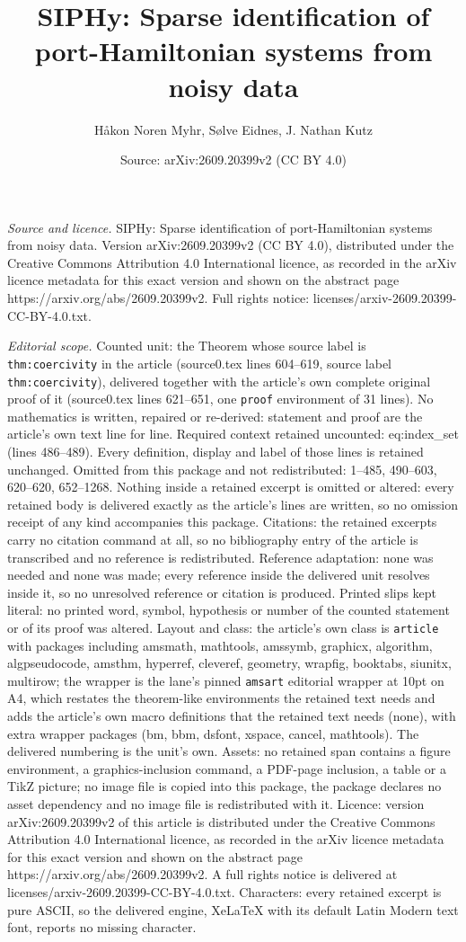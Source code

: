 \documentclass[10pt,a4paper]{amsart}
\title[SIPHy: Sparse identification of port-Hamiltonian systems fro]{SIPHy: Sparse identification of port-Hamiltonian systems from noisy data}
\author{H{\aa}kon Noren Myhr, S{\o}lve Eidnes, J. Nathan Kutz}
\date{Source: arXiv:2609.20399v2 (CC BY 4.0)}
\begin{document}
\maketitle

\noindent\emph{Source and licence.} SIPHy: Sparse identification of port-Hamiltonian systems from noisy data. Version arXiv:2609.20399v2 (CC BY 4.0), distributed under the Creative Commons Attribution 4.0 International licence, as recorded in the arXiv licence metadata for this exact version and shown on the abstract page https://arxiv.org/abs/2609.20399v2. Full rights notice: licenses/arxiv-2609.20399-CC-BY-4.0.txt.\par\smallskip

\noindent\textit{Editorial scope.} Counted unit: the Theorem whose source label is \texttt{thm:coercivity} in the article (source0.tex lines 604--619, source label \texttt{thm:coercivity}), delivered together with the article's own complete original proof of it (source0.tex lines 621--651, one \texttt{proof} environment of 31 lines). No mathematics is written, repaired or re-derived: statement and proof are the article's own text line for line. Required context retained uncounted: eq:index\_set (lines 486--489). Every definition, display and label of those lines is retained unchanged. Omitted from this package and not redistributed: 1--485, 490--603, 620--620, 652--1268. Nothing inside a retained excerpt is omitted or altered: every retained body is delivered exactly as the article's lines are written, so no omission receipt of any kind accompanies this package. Citations: the retained excerpts carry no citation command at all, so no bibliography entry of the article is transcribed and no reference is redistributed. Reference adaptation: none was needed and none was made; every reference inside the delivered unit resolves inside it, so no unresolved reference or citation is produced. Printed slips kept literal: no printed word, symbol, hypothesis or number of the counted statement or of its proof was altered. Layout and class: the article's own class is \texttt{article} with packages including amsmath, mathtools, amssymb, graphicx, algorithm, algpseudocode, amsthm, hyperref, cleveref, geometry, wrapfig, booktabs, siunitx, multirow; the wrapper is the lane's pinned \texttt{amsart} editorial wrapper at 10pt on A4, which restates the theorem-like environments the retained text needs and adds the article's own macro definitions that the retained text needs (none), with extra wrapper packages (bm, bbm, dsfont, xspace, cancel, mathtools). The delivered numbering is the unit's own. Assets: no retained span contains a figure environment, a graphics-inclusion command, a PDF-page inclusion, a table or a TikZ picture; no image file is copied into this package, the package declares no asset dependency and no image file is redistributed with it. Licence: version arXiv:2609.20399v2 of this article is distributed under the Creative Commons Attribution 4.0 International licence, as recorded in the arXiv licence metadata for this exact version and shown on the abstract page https://arxiv.org/abs/2609.20399v2. A full rights notice is delivered at licenses/arxiv-2609.20399-CC-BY-4.0.txt. Characters: every retained excerpt is pure ASCII, so the delivered engine, XeLaTeX with its default Latin Modern text font, reports no missing character.
\end{document}
